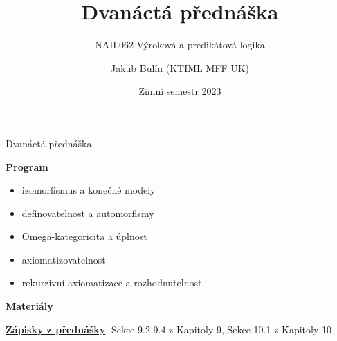 \documentclass{beamer}
\title{Dvanáctá přednáška}
\subtitle{NAIL062 Výroková a predikátová logika}
\author{Jakub Bulín (KTIML MFF UK)}
\date{Zimní semestr 2023}
\begin{document}
\frame{\titlepage}


\begin{frame}{Dvanáctá přednáška}

    \textbf{Program}
        \begin{itemize}
            \item izomorfismus a konečné modely
            \item definovatelnost a automorfismy
            \item Omega-kategoricita a úplnost
            \item axiomatizovatelnost
            \item rekurzivní axiomatizace a rozhodnutelnost
        \end{itemize}

    \textbf{Materiály}

        \href{https://github.com/jbulin-mff-uk/nail062/raw/main/lecture/lecture-notes/lecture-notes.pdf}{\alert{\textbf{Zápisky z přednášky}}}, Sekce 9.2-9.4 z Kapitoly 9, Sekce 10.1 z Kapitoly 10

\end{frame}
\end{document}
